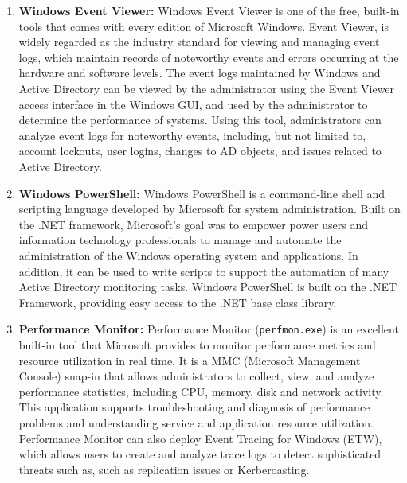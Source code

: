 \begin{enumerate}
    \item \textbf{Windows Event Viewer:} Windows Event Viewer is one of the free, built-in tools that comes with every edition of Microsoft Windows. Event Viewer, is widely regarded as the industry standard for viewing and managing event logs, which maintain records of noteworthy events and errors occurring at the hardware and software levels. The event logs maintained by Windows and Active Directory can be viewed by the administrator using the Event Viewer access interface in the Windows GUI, and used by the administrator to determine the performance of systems. Using this tool, administrators can analyze event logs for noteworthy events, including, but not limited to, account lockouts, user logins, changes to AD objects, and issues related to Active Directory.
    \item \textbf{Windows PowerShell:} Windows PowerShell is a command-line shell and scripting language developed by Microsoft for system administration. Built on the .NET framework, Microsoft’s goal was to empower power users and information technology professionals to manage and automate the administration of the Windows operating system and applications. In addition, it can be used to write scripts to support the automation of many Active Directory monitoring tasks. Windows PowerShell is built on the .NET Framework, providing easy access to the .NET base class library.
    \item \textbf{Performance Monitor:} Performance Monitor (\texttt{perfmon.exe}) is an excellent built-in tool that Microsoft provides to monitor performance metrics and resource utilization in real time. It is a MMC (Microsoft Management Console) snap-in that allows administrators to collect, view, and analyze performance statistics, including CPU, memory, disk and network activity. This application supports troubleshooting and diagnosis of performance problems and understanding service and application resource utilization. Performance Monitor can also deploy Event Tracing for Windows (ETW), which allows users to create and analyze trace logs to detect sophisticated threats such as, such as replication issues or Kerberoasting.

\end{enumerate}

